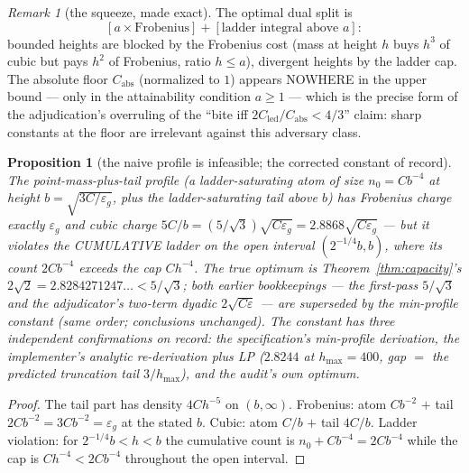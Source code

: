 \documentclass[11pt]{article}
\theoremstyle{plain}
\newtheorem{proposition}[theorem]{Proposition}
\theoremstyle{definition}
\theoremstyle{remark}
\newtheorem*{remk}{Remark}
\newcommand{\Cled}{C_{\mathrm{led}}}
\begin{document}
\begin{remk}[the squeeze, made exact]
The optimal dual split is
\[
  [a \times \text{Frobenius}] + [\text{ladder integral above } a] :
\]
bounded
heights are blocked by the Frobenius cost (mass at height $h$ buys $h^3$ of cubic
but pays $h^2$ of Frobenius, ratio $h \le a$), divergent heights by the ladder
cap. The absolute floor $C_{\mathrm{abs}}$ (normalized to $1$) appears NOWHERE in
the upper bound --- only in the attainability condition $a \ge 1$ --- which is
the precise form of the adjudication's overruling of the ``bite iff
$2\Cled/C_{\mathrm{abs}} < 4/3$'' claim: sharp constants at the floor are
irrelevant against this adversary class.
\end{remk}

\begin{proposition}[the naive profile is infeasible; the corrected constant of
record]
\label{prop:naive}
The point-mass-plus-tail profile (a ladder-saturating atom of size
$n_0 = C b^{-4}$ at height $b = \sqrt{3C/\varepsilon_g}$, plus the
ladder-saturating tail above $b$) has Frobenius charge exactly $\varepsilon_g$
and cubic charge
$5C/b = (5/\sqrt{3})\sqrt{C \varepsilon_g} = 2.8868\sqrt{C \varepsilon_g}$ ---
but it violates the CUMULATIVE ladder on the open interval $(2^{-1/4} b, b)$,
where its count $2 C b^{-4}$ exceeds the cap $C h^{-4}$. The true optimum is
Theorem~\ref{thm:capacity}'s $2\sqrt{2} = 2.8284271247\ldots < 5/\sqrt{3}$; both
earlier bookkeepings --- the first-pass $5/\sqrt{3}$ and the adjudicator's
two-term dyadic $2\sqrt{C\varepsilon}$ --- are superseded by the min-profile
constant (same order; conclusions unchanged). The constant has three independent
confirmations on record: the specification's min-profile derivation, the
implementer's analytic re-derivation plus LP ($2.8244$ at
$h_{\max} = 400$, gap $=$ the predicted truncation tail $3/h_{\max}$), and the
audit's own optimum.
\end{proposition}

\begin{proof}
The tail part has density $4 C h^{-5}$ on $(b, \infty)$. Frobenius: atom
$C b^{-2}$ $+$ tail $2 C b^{-2} = 3 C b^{-2} = \varepsilon_g$ at the stated $b$.
Cubic: atom $C/b$ $+$ tail $4C/b$. Ladder violation: for
$2^{-1/4} b < h < b$ the cumulative count is $n_0 + C b^{-4} = 2 C b^{-4}$ while
the cap is $C h^{-4} < 2 C b^{-4}$ throughout the open interval.
\end{proof}
\end{document}
